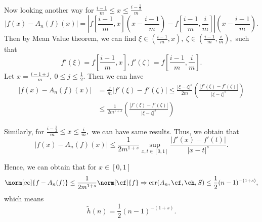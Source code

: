 Now looking another way for $\frac{i-1}{m} \leq x \leq \frac{i-\frac{1}{2}}{m}$
$$\left|f(x)-A_{n}(f)(x)\right|=\left|f\left[\frac{i-1}{m},x\right]\left(x-\frac{i-1}{m}\right)-f\left[\frac{i-1}{m},\frac{i}{m}\right]\right|\left(x-\frac{i-1}{m}\right).$$
Then by Mean Value theorem, we can find $\xi \in \left(\frac{i-1}{m},x\right), \ \zeta \in \left(\frac{i-1}{m},\frac{i}{m}\right),$ such that
$$f'(\xi)=f\left[\frac{i-1}{m},x\right],f'(\zeta)=f\left[\frac{i-1}{m},\frac{i}{m}\right].$$
Let $x=\frac{i-1+j}{m}, \ 0 \leq j \leq \frac{1}{2}.$ Then we can have
\begin{align*}
\left|f(x)-A_{n}(f)(x)\right|&=\frac{j}{m}|f'(\xi)-f'(\zeta)| \leq \frac{|\xi-\zeta|^{s}}{2m}\left(\frac{|f'(\xi)-f'(\zeta)|}{|\xi-\zeta|^{s}}\right)  \\
 & \leq \frac{1}{2m^{1+s}}\left(\frac{|f'(\xi)-f'(\zeta)|}{|\xi-\zeta|^{s}}\right)
\end{align*}

Similarly, for $\frac{i-\frac{1}{2}}{m} \leq x \leq \frac{i}{m},$ we can have same results.
Thus, we obtain that
$$\left|f(x)-A_{n}(f)(x)\right|\leq \frac{1}{2m^{1+s}}\sup\limits_{x,t \in [0,1]}\frac{|f'(x)-f'(t)|}{|x-t|^{s}}.$$

Hence, we can obtain that for $x \in [0,1]$
\begin{equation}\label{errorf}\norm[\infty]{f-A_{n}(f)} \leq  \frac{1}{2m^{1+s}}\norm[\cf]{f} \Rightarrow \err(A_n,\cf,\ch,S) \leq \frac{1}{2}(n-1)^{-(1+s)},
\end{equation}
which means $$\tilde{h}(n)=\frac{1}{2}(n-1)^{-(1+s)}.$$


